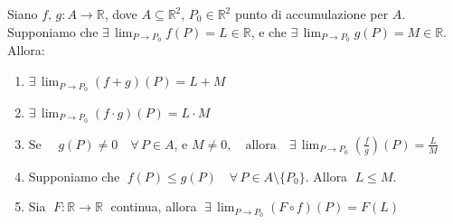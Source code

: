 \begin{thm}
Siano $f,\, g : A \longrightarrow \mathbb{R}$, dove $A \subseteq \mathbb{R}^2$, $P_0 \in \mathbb{R}^2$ punto di accumulazione per $A$. Supponiamo che $\displaystyle \exists \, \lim_{P \rightarrow P_0} f(P) = L \in \mathbb{R}$, e che $\displaystyle \exists \, \lim_{P \rightarrow P_0} g(P) = M \in \mathbb{R}$. Allora:
\begin{enumerate}[labelindent=\parindent,leftmargin=*,label=\textnormal{(\roman*)},start=1]
\item $\displaystyle \exists \, \lim_{P \rightarrow P_0} (f + g)(P) = L + M$
\item $\displaystyle \exists \, \lim_{P \rightarrow P_0} (f \cdot g)(P) = L \cdot M$
\item Se $\quad g(P) \neq 0 \quad \forall \, P \in A$, e $M \neq 0, \quad \text{allora} \displaystyle \quad \exists \, \lim_{P \rightarrow P_0} \left( \frac{f}{g} \right) (P) = \frac{L}{M}$
\item Supponiamo che $\; f(P) \leq g(P) \quad \forall \, P \in A \setminus \lbrace P_0 \rbrace$. Allora $\; L \leq M$.
\item Sia $\; F: \mathbb{R} \longrightarrow \mathbb{R} \;$ continua, allora $\displaystyle \; \exists \, \lim_{P \rightarrow P_0} (F \circ f)(P) = F(L)$
\end{enumerate}
\end{thm}
